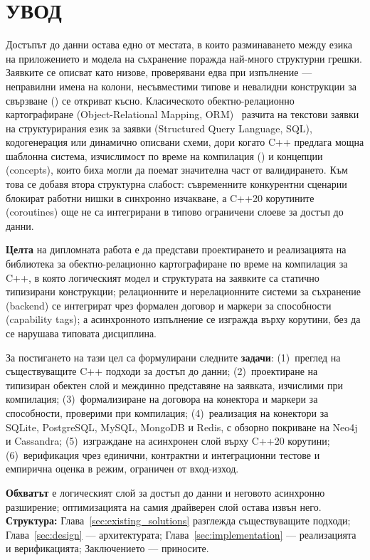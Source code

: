 \section*{УВОД}
\label{sec:introduction}

Достъпът до данни остава едно от местата, в които разминаването между езика на приложението и модела на съхранение поражда най-много структурни грешки. Заявките се описват като низове, проверявани едва при изпълнение --- неправилни имена на колони, несъвместими типове и невалидни конструкции за свързване () се откриват късно. Класическото обектно-релационно картографиране (Object-Relational Mapping, ORM)~\cite{fowler2002} разчита на текстови заявки на структурирания език за заявки (Structured Query Language, SQL), кодогенерация или динамично описвани схеми, дори когато C++ предлага мощна шаблонна система, изчислимост по време на компилация () и концепции (concepts), които биха могли да поемат значителна част от валидирането. Към това се добавя втора структурна слабост: съвременните конкурентни сценарии блокират работни нишки в синхронно изчакване, а C++20 корутините (coroutines) още не са интегрирани в типово ограничени слоеве за достъп до данни.

\textbf{Целта} на дипломната работа е да представи проектирането и реализацията на библиотека за обектно-релационно картографиране по време на компилация за C++, в която логическият модел и структурата на заявките са статично типизирани конструкции; релационните и нерелационните системи за съхранение (backend) се интегрират чрез формален договор и маркери за способности (capability tags); а асинхронното изпълнение се изгражда върху корутини, без да се нарушава типовата дисциплина.

За постигането на тази цел са формулирани следните \textbf{задачи}: (1)~преглед на съществуващите C++ подходи за достъп до данни; (2)~проектиране на типизиран обектен слой и междинно представяне на заявката, изчислими при компилация; (3)~формализиране на договора на конектора и маркери за способности, проверими при компилация; (4)~реализация на конектори за SQLite, PostgreSQL, MySQL, MongoDB и Redis, с обзорно покриване на Neo4j и Cassandra; (5)~изграждане на асинхронен слой върху C++20 корутини; (6)~верификация чрез единични, контрактни и интеграционни тестове и емпирична оценка в режим, ограничен от вход-изход.

\textbf{Обхватът} е логическият слой за достъп до данни и неговото асинхронно разширение; оптимизацията на самия драйверен слой остава извън него. \textbf{Структура:} Глава~\ref{sec:existing_solutions} разглежда съществуващите подходи; Глава~\ref{sec:design} --- архитектурата; Глава~\ref{sec:implementation} --- реализацията и верификацията; Заключението --- приносите.
